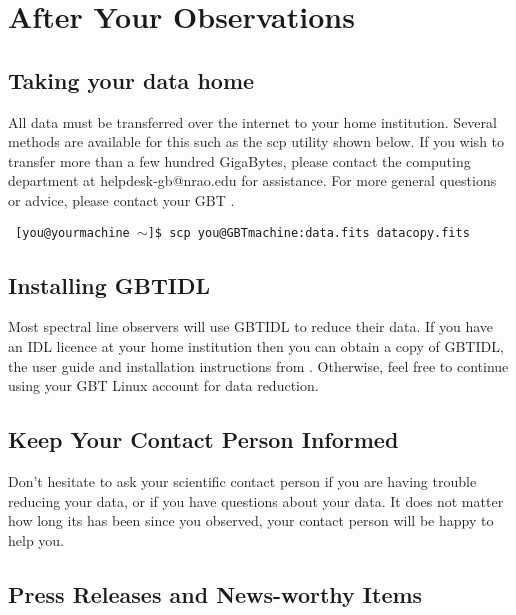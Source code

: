 \chapter{After Your Observations}\label{chap:after}

\section{Taking your data home}

All data must be transferred over the internet to your home institution.
Several methods are available for this such as the scp utility shown below.
If you wish to transfer more than a few hundred GigaBytes, please contact
the computing department at helpdesk-gb@nrao.edu for assistance.  For more
general questions or advice, please contact your \gls{GBT} .

{\tt
[you@yourmachine $\sim$]\$ scp you@GBTmachine:data.fits datacopy.fits
}

\section{Installing GBTIDL}

Most spectral line observers will use \gls{GBTIDL} to reduce their data.
If you have an IDL licence at your home institution then you can obtain
a copy of \gls{GBTIDL}, the user guide and installation instructions from
.
Otherwise, feel free to continue using your \gls{GBT} Linux account for
data reduction.

\section{Keep Your Contact Person Informed}

Don't hesitate to ask your scientific contact person if you are having
trouble reducing your data, or if you have questions about your data.
It does not matter how long its has been since you observed, your contact
person will be happy to help you.

\section{Press Releases and News-worthy Items}

